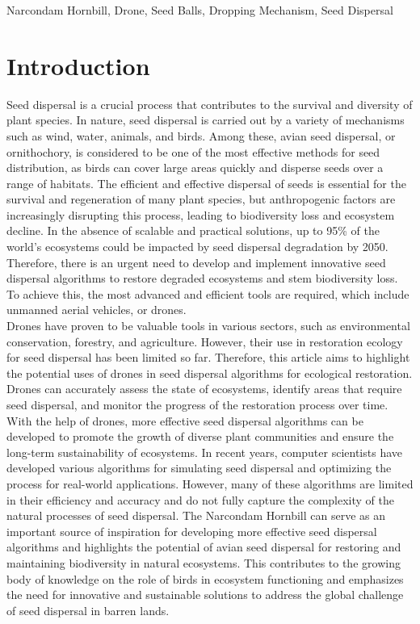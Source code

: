 \documentclass[conference]{IEEEtran}
\begin{document}
\begin{IEEEkeywords}
Narcondam Hornbill, Drone, Seed Balls, Dropping Mechanism, Seed Dispersal
\end{IEEEkeywords}

\section{Introduction}
Seed dispersal is a crucial process that contributes to the survival and diversity of plant species. In nature, seed dispersal is carried out by a variety of mechanisms such as wind, water, animals, and birds. Among these, avian seed dispersal, or ornithochory, is considered to be one of the most effective methods for seed distribution, as birds can cover large areas quickly and disperse seeds over a range of habitats. The efficient and effective dispersal of seeds is essential for the survival and regeneration of many plant species, but anthropogenic factors are increasingly disrupting this process, leading to biodiversity loss and ecosystem decline. In the absence of scalable and practical solutions, up to 95\% of the world's ecosystems could be impacted by seed dispersal degradation by 2050. Therefore, there is an urgent need to develop and implement innovative seed dispersal algorithms to restore degraded ecosystems\cite{1} and stem biodiversity loss. To achieve this, the most advanced and efficient tools are required, which include unmanned aerial vehicles, or drones. 
\\Drones have proven to be valuable tools in various sectors, such as environmental conservation, forestry, and agriculture\cite{2}. However, their use in restoration ecology for seed dispersal has been limited so far. Therefore, this article aims to highlight the potential uses of drones in seed dispersal algorithms for ecological restoration. Drones can accurately assess the state of ecosystems, identify areas that require seed dispersal, and monitor the progress of the restoration process over time\cite{3}. With the help of drones, more effective seed dispersal algorithms can be developed to promote the growth of diverse plant communities and ensure the long-term sustainability of ecosystems. In recent years, computer scientists have developed various algorithms for simulating seed dispersal and optimizing the process for real-world applications. However, many of these algorithms are limited in their efficiency and accuracy and do not fully capture the complexity of the natural processes of seed dispersal. The Narcondam Hornbill can serve as an important source of inspiration for developing more effective seed dispersal algorithms and highlights the potential of avian seed dispersal for restoring and maintaining biodiversity in natural ecosystems. This contributes to the growing body of knowledge on the role of birds in ecosystem functioning and emphasizes the need for innovative and sustainable solutions to address the global challenge of seed dispersal in barren lands.
\end{document}
